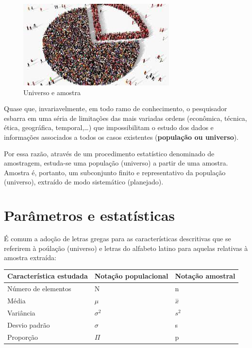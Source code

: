 \documentclass[
]{book}
\begin{document}
\begin{figure}

{\centering \includegraphics[width=1\linewidth]{images2/amostragem} 

}

\caption{Universo e amostra}\label{fig:unnamed-chunk-23}
\end{figure}

Quase que, invariavelmente, em todo ramo de conhecimento, o pesquisador esbarra em uma séria de limitações das mais variadas ordens (econômica, técnica, ética, geográfica, temporal,\ldots) que impossibilitam o estudo dos dados e informações associados a todos os casos existentes (\textbf{população ou universo}).

Por essa razão, através de um procedimento estatístico denominado de amostragem, estuda-se uma população (universo) a partir de uma amostra. Amostra é, portanto, um subconjunto finito e representativo da população (universo), extraído de modo sistemático (planejado).

\hypertarget{paruxe2metros-e-estatuxedsticas}{%
\section{Parâmetros e estatísticas}\label{paruxe2metros-e-estatuxedsticas}}

É comum a adoção de letras gregas para as características descritivas que se referirem à poúlação (universo) e letras do alfabeto latino para aquelas relativas à amostra extraída:

\begin{longtable}[]{@{}lll@{}}
\toprule()
Característica estudada & Notação populacional & Notação amostral \\
\midrule()
\endhead
Número de elementos & N & n \\
Média & \(\mu\) & \(\stackrel{-}{x}\) \\
Variância & \(\sigma^{2}\) & \({s}^{2}\) \\
Desvio padrão & \(\sigma\) & s \\
Proporção & \(\Pi\) & p \\
\bottomrule()
\end{longtable}
\end{document}
